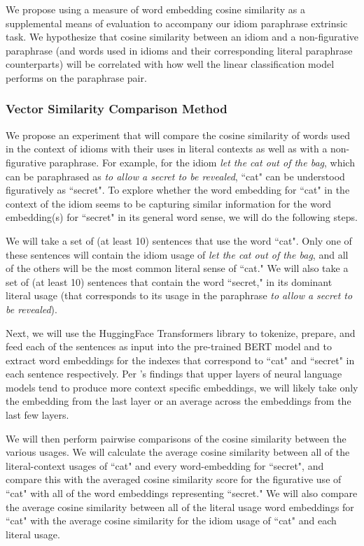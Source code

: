 \documentclass[11pt,a4paper]{article}
\begin{document}
 We propose using a measure of word embedding cosine similarity as a supplemental means of evaluation to accompany our idiom paraphrase extrinsic task. We hypothesize that cosine similarity between an idiom and a non-figurative paraphrase (and words used in idioms and their corresponding literal paraphrase counterparts) will be correlated with how well the linear classification model performs on the paraphrase pair.
 
 \subsubsection{Vector Similarity Comparison Method}
 
 We propose an experiment that will compare the cosine similarity of words used in the context of idioms with their uses in literal contexts as well as with a non-figurative paraphrase. For example, for the idiom \textit{let the cat out of the bag}, which can be paraphrased as \textit{to allow a secret to be revealed}, ``cat" can be understood figuratively as ``secret". To explore whether the word embedding for ``cat" in the context of the idiom seems to be capturing similar information for the word embedding(s) for ``secret" in its general word sense, we will do the following steps. 
 
 We will take a set of (at least 10) sentences that use the word ``cat".  Only one of these sentences will contain the idiom usage of \textit{let the cat out of the bag}, and all of the others will be the most common literal sense of ``cat." We will also take a set of (at least 10) sentences that contain the word ``secret," in its dominant literal usage (that corresponds to its usage in the paraphrase \textit{to allow a secret to be revealed}). 
 
 Next, we will use the HuggingFace Transformers library \citep{wolf2019huggingfaces} to tokenize, prepare, and feed each of the sentences as input into the pre-trained BERT model and to extract word embeddings for the indexes that correspond to ``cat" and ``secret" in each sentence respectively. Per \citep{ethayarajh2019contextual}'s findings that upper layers of neural language models tend to produce more context specific embeddings, we will likely take only the embedding from the last layer or an average across the embeddings from the last few layers.
 
 We will then perform pairwise comparisons of the cosine similarity between the various usages. We will calculate the average cosine similarity between all of the literal-context usages of ``cat" and every word-embedding for ``secret", and compare this with the averaged cosine similarity score for the figurative use of ``cat" with all of the  word embeddings representing ``secret." We will also compare the average cosine similarity between all of the literal usage word embeddings for ``cat" with the average cosine similarity for the idiom usage of ``cat" and each literal usage.
 
\end{document}
